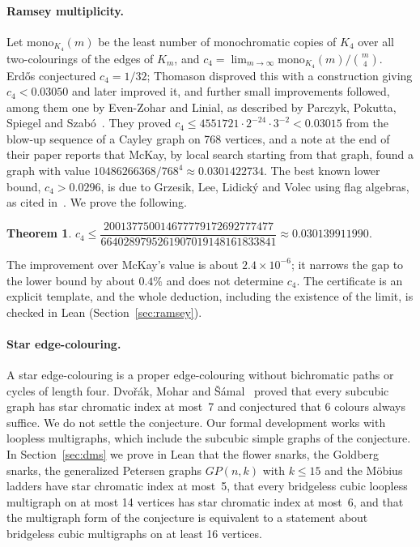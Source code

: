 \documentclass[11pt,a4paper]{article}
\newtheorem{theorem}{Theorem}[section]
\theoremstyle{remark}
\begin{document}
\paragraph{Ramsey multiplicity.}
Let $\mathrm{mono}_{K_4}(m)$ be the least number of monochromatic copies of $K_4$ over all two-colourings of the edges
of $K_m$, and $c_4=\lim_{m\to\infty}\mathrm{mono}_{K_4}(m)/\binom m4$. Erd\H{o}s conjectured $c_4=1/32$; Thomason
disproved this with a construction giving $c_4<0.03050$ and later improved it, and further small improvements
followed, among them one by Even-Zohar and Linial, as described by Parczyk, Pokutta, Spiegel and
Szab\'o~\cite{ppss}. They proved $c_4 \le 4551721\cdot2^{-24}\cdot3^{-2} < 0.03015$ from the blow-up sequence of a
Cayley graph on 768 vertices, and a note at the end of their paper reports that McKay, by local search starting from
that graph, found a graph with value $10486266368/768^4 \approx 0.0301422734$. The best known lower bound,
$c_4>0.0296$, is due to Grzesik, Lee, Lidick\'y and Volec using flag algebras, as cited in~\cite{ppss}. We prove the
following.

\begin{theorem}\label{thm:ramsey}
$c_4 \le \dfrac{200137750014677779172692777477}{6640289795261907019148161833841} \approx 0.030139911990.$
\end{theorem}

\noindent The improvement over McKay's value is about $2.4\times10^{-6}$; it narrows the gap to the lower bound by
about $0.4\%$ and does not determine $c_4$. The certificate is an explicit template, and the whole deduction,
including the existence of the limit, is checked in Lean (Section~\ref{sec:ramsey}).

\paragraph{Star edge-colouring.}
A star edge-colouring is a proper edge-colouring without bichromatic paths or cycles of length four. Dvo\v{r}\'ak,
Mohar and \v{S}\'amal~\cite{dms} proved that every subcubic graph has star chromatic index at most~7 and conjectured
that $6$ colours always suffice. We do not settle the conjecture. Our formal development works with loopless
multigraphs, which include the subcubic simple graphs of the conjecture. In Section~\ref{sec:dms} we prove in Lean that the
flower snarks, the Goldberg snarks, the generalized Petersen graphs $GP(n,k)$ with $k\le15$ and the M\"obius ladders
have star chromatic index at most~5, that every bridgeless cubic loopless multigraph on at most 14 vertices has star
chromatic index at most~6, and that the multigraph form of the conjecture is equivalent to a statement about
bridgeless cubic multigraphs on at least 16 vertices.
\end{document}

